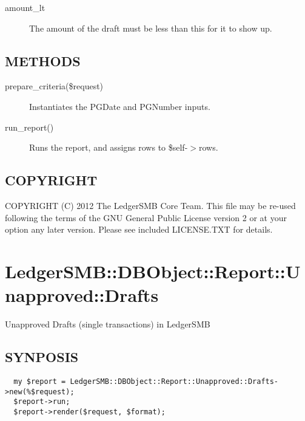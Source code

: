 \begin{description}
\begin{description}
\begin{description}
\begin{description}
\begin{description}
\begin{description}
\begin{description}
\begin{description}
\begin{description}
\begin{description}
\begin{description}
\item[{amount\_lt}] \mbox{}

The amount of the draft must be less than this for it to show up.

\end{description}
\subsection*{METHODS\label{LedgerSMB::DBObject::Report::Unapproved::Batch_Overview_METHODS}}
\begin{description}

\item[{prepare\_criteria(\$request)}] \mbox{}

Instantiates the PGDate and PGNumber inputs.


\item[{run\_report()}] \mbox{}

Runs the report, and assigns rows to \$self-$>$rows.

\end{description}
\subsection*{COPYRIGHT\label{LedgerSMB::DBObject::Report::Unapproved::Batch_Overview_COPYRIGHT}}


COPYRIGHT (C) 2012 The LedgerSMB Core Team.  This file may be re-used following
the terms of the GNU General Public License version 2 or at your option any
later version.  Please see included LICENSE.TXT for details.

\section{LedgerSMB::DBObject::Report::Unapproved::Drafts\label{LedgerSMB::DBObject::Report::Unapproved::Drafts}}


Unapproved Drafts (single 
transactions) in LedgerSMB

\subsection*{SYNPOSIS\label{LedgerSMB::DBObject::Report::Unapproved::Drafts_SYNPOSIS}}
\begin{verbatim}
  my $report = LedgerSMB::DBObject::Report::Unapproved::Drafts->new(%$request);
  $report->run;
  $report->render($request, $format);
\end{verbatim}

\end{description}
\end{description}
\end{description}
\end{description}
\end{description}
\end{description}
\end{description}
\end{description}
\end{description}
\end{description}
